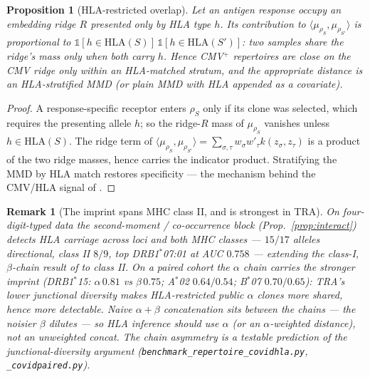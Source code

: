 \documentclass[11pt]{article}
\theoremstyle{oldplain}
\newtheorem{proposition}{Proposition}
\theoremstyle{oldrem}
\newtheorem{remark}{Remark}
\newcommand{\code}[1]{\texttt{#1}}
\begin{document}
\begin{proposition}[{\scshape HLA}-restricted overlap]\label{prop:hla}
Let an antigen response occupy an embedding ridge $R$ presented only by {\scshape HLA} type $h$. Its contribution
to $\langle\mu_{\rho_S},\mu_{\rho_{S'}}\rangle$ is proportional to
$\mathds{1}[h\in\mathrm{HLA}(S)]\,\mathds{1}[h\in\mathrm{HLA}(S')]$: two samples share the ridge's mass only when
both carry $h$. Hence {\scshape CMV}$^{+}$ repertoires are close on the {\scshape CMV} ridge only within an
{\scshape HLA}-matched stratum, and the appropriate distance is an {\scshape HLA}-stratified {\scshape MMD} (or
plain {\scshape MMD} with {\scshape HLA} appended as a covariate).
\end{proposition}
\begin{proof}
A response-specific receptor enters $\rho_S$ only if its clone was selected, which requires the presenting allele
$h$; so the ridge-$R$ mass of $\mu_{\rho_S}$ vanishes unless $h\in\mathrm{HLA}(S)$. The ridge term of
$\langle\mu_{\rho_S},\mu_{\rho_{S'}}\rangle=\sum_{\sigma,\tau}w_\sigma w'_\tau k(z_\sigma,z_\tau)$ is a product of
the two ridge masses, hence carries the indicator product. Stratifying the {\scshape MMD} by {\scshape HLA} match
restores specificity --- the mechanism behind the {\scshape CMV}/{\scshape HLA} signal of \cite{Emerson2017}. \end{proof}

\begin{remark}[The imprint spans {\normalfont\scshape MHC} class II, and is strongest in {\normalfont\scshape TRA}]\label{rem:hlaclass}
On four-digit-typed data the second-moment / co-occurrence block (Prop.~\ref{prop:interact}) detects {\scshape
HLA} carriage across loci and \emph{both} {\scshape MHC} classes --- $15/17$ alleles directional, class II
$8/9$, top {\scshape DRB1}$^*$07:01 at {\scshape AUC} $0.758$ --- extending the class-I, $\beta$-chain result of
\cite{DeWitt2018} to class II. On a paired cohort the \emph{$\alpha$ chain carries the stronger imprint}
({\scshape DRB1}$^*$15: $\alpha\,0.81$ vs $\beta\,0.75$; A$^*$02 $0.64/0.54$; B$^*$07 $0.70/0.65$): {\scshape
TRA}'s lower junctional diversity makes {\scshape HLA}-restricted public $\alpha$ clones more shared, hence more
detectable. Naive $\alpha{+}\beta$ concatenation sits \emph{between} the chains --- the noisier $\beta$ dilutes
--- so {\scshape HLA} inference should use $\alpha$ (or an $\alpha$-weighted distance), not an unweighted concat.
The chain asymmetry is a testable prediction of the junctional-diversity argument
(\code{benchmark\_repertoire\_covidhla.py}, \code{\_covidpaired.py}).
\end{remark}
\end{document}
